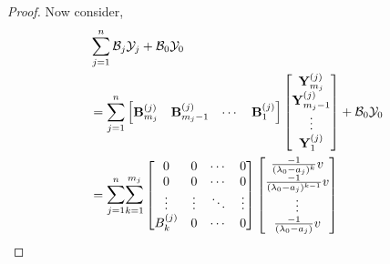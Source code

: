 \documentclass[12pt, reqno]{amsart}
\theoremstyle{definition}
\theoremstyle{remark}
\numberwithin{equation}{section}
\begin{document}
\begin{proof}
Now consider,
\begin{align*}
& \displaystyle \sum_{j=1}^{n} \mathcal{B}_j \mathcal{Y}_j+ \mathcal{B}_0\mathcal{Y}_0 \\ 
& = \sum_{j=1}^{n} \begin{bmatrix}
\textbf{B}_{m_j}^{(j)} & \textbf{B}_{m_j -1}^{(j)} & \cdots & \textbf{B}_1^{(j)}  
\end{bmatrix} \begin{bmatrix}
\textbf{Y}_{m_j}^{(j)}\\
\textbf{Y}_{m_j -1}^{(j)}\\
\vdots \\
\textbf{Y}_1^{(j)}\\
\end{bmatrix}+\mathcal{B}_0\mathcal{Y}_0 \\
& =\mathlarger \sum_{j=1}^{n} \mathlarger \sum_{k=1}^{m_j} \begin{bmatrix}
0 & 0 & \cdots & 0 \\
0 & 0 & \cdots & 0 \\
\vdots & \vdots & \ddots & \vdots\\
B_k^{(j)} & 0 & \cdots & 0 \\
\end{bmatrix} \begin{bmatrix}
\frac{-1}{(\lambda_0-a_j)^k}v\\
\frac{-1}{(\lambda_0-a_j)^{k-1}}v\\
\vdots\\
\frac{-1}{(\lambda_0-a_j)}v\\
\end{bmatrix}
\end{align*} 


\end{proof}
\end{document}

